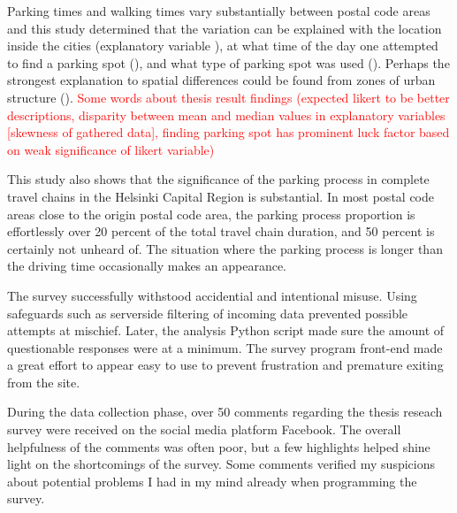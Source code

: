 Parking times and walking times vary substantially between postal code areas and this study determined that the variation can be explained with the location inside the cities (explanatory variable ), at what time of the day one attempted to find a parking spot (), and what type of parking spot was used (). Perhaps the strongest explanation to spatial differences could be found from zones of urban structure (). 
\textcolor{red}{Some words about thesis result findings (expected likert to be better descriptions, disparity between mean and median values in explanatory variables [skewness of gathered data], finding parking spot has prominent luck factor based on weak significance of likert variable)}

This study also shows that the significance of the parking process in complete travel chains in the Helsinki Capital Region is substantial. In most postal code areas close to the origin postal code area, the parking process proportion is effortlessly over 20 percent of the total travel chain duration, and 50 percent is certainly not unheard of. The situation where the parking process is longer than the driving time occasionally makes an appearance. 

The survey successfully withstood accidential and intentional misuse. Using safeguards such as serverside filtering of incoming data prevented possible attempts at mischief. Later, the analysis Python script made sure the amount of questionable responses were at a minimum. The survey program front-end made a great effort to appear easy to use to prevent frustration and premature exiting from the site.

During the data collection phase, over 50 comments regarding the thesis reseach survey were received on the social media platform Facebook. The overall helpfulness of the comments was often poor, but a few highlights helped shine light on the shortcomings of the survey. Some comments verified my suspicions about potential problems I had in my mind already when programming the survey.


